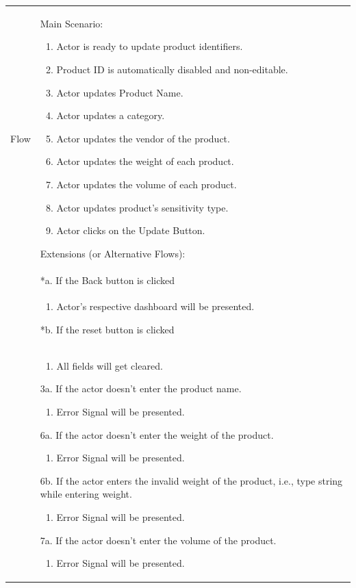 \documentclass[12pt,a4paper]{report}
\begin{document}
\begin{tabular}{ | m{3cm} | m{12cm}| } \hline

Flow & Main Scenario:

\begin{enumerate}

\item Actor is ready to update product identifiers.
\item Product ID is automatically disabled and non-editable.
\item Actor updates Product Name.
\item Actor updates a category.
\item Actor updates the vendor of the product.
\item Actor updates the weight of each product.
\item Actor updates the volume of each product.
\item Actor updates product's sensitivity type.
\item Actor clicks on the Update Button.

\end{enumerate}

Extensions (or Alternative Flows):\\
& *a. If the Back button is clicked \\
& \begin{enumerate}
		\item Actor's respective dashboard will be presented.
	\end{enumerate}
*b. If the reset button is clicked \\
&	\begin{enumerate}
		\item All fields will get cleared.
	\end{enumerate}
3a. If the actor doesn't enter the product name.
 	\begin{enumerate}
		\item Error Signal will be presented.
	\end{enumerate}
6a. If the actor doesn't enter the weight of the product.
 	\begin{enumerate}
		\item Error Signal will be presented.
	\end{enumerate}
6b. If the actor enters the invalid weight of the product, i.e., type string while entering weight.
 	\begin{enumerate}
		\item Error Signal will be presented.
	\end{enumerate}
7a. If the actor doesn't enter the volume of the product.
 	\begin{enumerate}
		\item Error Signal will be presented.
	\end{enumerate}
\\ \hline
\end{tabular}
\end{document}
